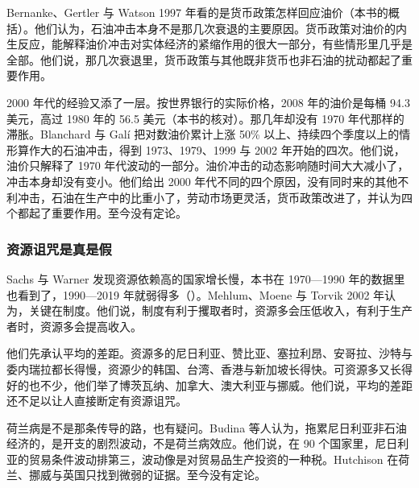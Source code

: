 Bernanke、Gertler 与 Watson 1997 年看的是货币政策怎样回应油价（本书的概括）。他们认为，石油冲击本身不是那几次衰退的主要原因\cite{bgw1997}。货币政策对油价的内生反应，能解释油价冲击对实体经济的紧缩作用的很大一部分，有些情形里几乎是全部\cite{bgw1997}。他们说，那几次衰退里，货币政策与其他既非货币也非石油的扰动都起了重要作用\cite{bgw1997}。

2000 年代的经验又添了一层。按世界银行的实际价格，2008 年的油价是每桶 94.3 美元，高过 1980 年的 56.5 美元（本书的核对）。那几年却没有 1970 年代那样的滞胀。Blanchard 与 Galí 把对数油价累计上涨 50\% 以上、持续四个季度以上的情形算作大的石油冲击，得到 1973、1979、1999 与 2002 年开始的四次\cite{blanchardgali2007}。他们说，油价只解释了 1970 年代波动的一部分\cite{blanchardgali2007}。油价冲击的动态影响随时间大大减小了，冲击本身却没有变小\cite{blanchardgali2007}。他们给出 2000 年代不同的四个原因，没有同时来的其他不利冲击，石油在生产中的比重小了，劳动市场更灵活，货币政策改进了，并认为四个都起了重要作用\cite{blanchardgali2007}。至今没有定论。

\subsubsection{资源诅咒是真是假}

Sachs 与 Warner 发现资源依赖高的国家增长慢，本书在 1970—1990 年的数据里也看到了，1990—2019 年就弱得多（）。Mehlum、Moene 与 Torvik 2002 年认为，关键在制度\cite{mmt2002}。他们说，制度有利于攫取者时，资源多会压低收入，有利于生产者时，资源多会提高收入\cite{mmt2002}。

他们先承认平均的差距。资源多的尼日利亚、赞比亚、塞拉利昂、安哥拉、沙特与委内瑞拉都长得慢，资源少的韩国、台湾、香港与新加坡长得快\cite{mmt2002}。可资源多又长得好的也不少，他们举了博茨瓦纳、加拿大、澳大利亚与挪威\cite{mmt2002}。他们说，平均的差距还不足以让人直接断定有资源诅咒\cite{mmt2002}。

荷兰病是不是那条传导的路，也有疑问。Budina 等人认为，拖累尼日利亚非石油经济的，是开支的剧烈波动，不是荷兰病效应\cite{budina2007}。他们说，在 90 个国家里，尼日利亚的贸易条件波动排第三，波动像是对贸易品生产投资的一种税\cite{budina2007}。Hutchison 在荷兰、挪威与英国只找到微弱的证据\cite{hutchison1990}。至今没有定论。

